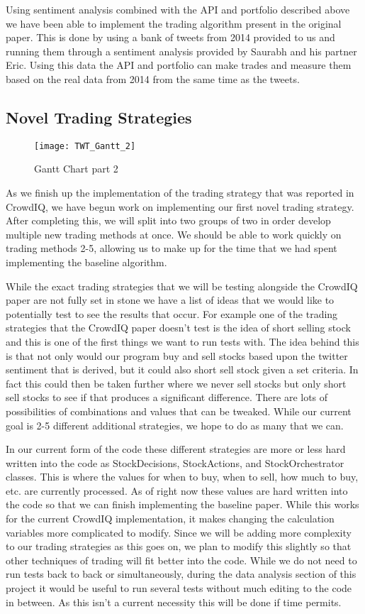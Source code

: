 Using sentiment analysis combined with the API and portfolio described above we have been able to implement the trading algorithm present in the original paper. This is done by using a bank of tweets from 2014 provided to us and running them through a sentiment analysis provided by Saurabh and his partner Eric. Using this data the API and portfolio can make trades and measure them based on the real data from 2014 from the same time as the tweets. 

\subsection{Novel Trading Strategies}
\begin{figure}[!ht]
	\centering
	\texttt{[image: TWT\_Gantt\_2]}
	\caption{Gantt Chart part 2}\label{fig:TWT_Gantt_2}
\end{figure}
As we finish up the implementation of the trading strategy that was reported in CrowdIQ, we have begun work on implementing our first novel trading strategy.  After completing this, we will split into two groups of two in order develop multiple new trading methods at once.  We should be able to work quickly on trading methods 2-5, allowing us to make up for the time that we had spent implementing the baseline algorithm.

While the exact trading strategies that we will be testing alongside the CrowdIQ paper are not fully set in stone we have a list of ideas that we would like to potentially test to see the results that occur. For example one of the trading strategies that the CrowdIQ paper doesn’t test is the idea of short selling stock and this is one of the first things we want to run tests with. The idea behind this is that not only would our program buy and sell stocks based upon the twitter sentiment that is derived, but it could also short sell stock given a set criteria. In fact this could then be taken further where we never sell stocks but only short sell stocks to see if that produces a significant difference. There are lots of possibilities of combinations and values that can be tweaked. While our current goal is 2-5 different additional strategies, we hope to do as many that we can.

In our current form of the code these different strategies are more or less hard written into the code as StockDecisions, StockActions, and StockOrchestrator classes. This is where the values for when to buy, when to sell, how much to buy, etc. are currently processed. As of right now these values are hard written into the code so that we can finish implementing the baseline paper. While this works for the current CrowdIQ implementation, it makes changing the calculation variables more complicated to modify. Since we will be adding more complexity to our trading strategies as this goes on, we plan to modify this slightly so that other techniques of trading will fit better into the code. While we do not need to run tests back to back or simultaneously, during the data analysis section of this project it would be useful to run several tests without much editing to the code in between. As this isn’t a current necessity this will be done if time permits.

